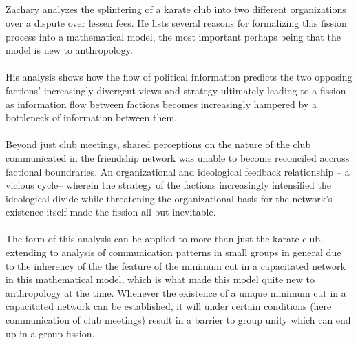 \documentclass[11pt]{article}
\begin{document}
\subsection{}
Zachary\cite{Zachary} analyzes the splintering of a karate club into two different organizations
over a dispute over lessen fees. He lists several reasons for formalizing this fission
process into a mathematical model, the most important perhaps being that the model is
new to anthropology.\\
\\
His analysis shows how the flow of political information predicts the two opposing
factions' increasingly divergent views and strategy ultimately leading to a fission
as information flow between factions becomes increasingly hampered by a bottleneck
of information between them.\\
\\
Beyond just club meetings, shared perceptions on the nature of the club communicated
in the friendship network was unable to become reconciled accross factional boundraries.
An organizational and ideological feedback relationship -- a vicious cycle-- wherein the
strategy of the factions increasingly intensified the ideological divide while threatening
the organizational basis for the network's existence itself made the fission all but
inevitable.\\
\\
The form of this analysis can be applied to more than just the karate club, extending to
analysis of communication patterns in small groups in general due to the inherency of the
the feature of the minimum cut in a capacitated network in this mathematical model, which
is what made this model quite new to anthropology at the time. Whenever the existence of
a unique minimum cut in a capacitated network can be established, it will under certain
conditions (here communication of club meetings) result in a barrier to group unity which
can end up in a group fission.
\end{document}
